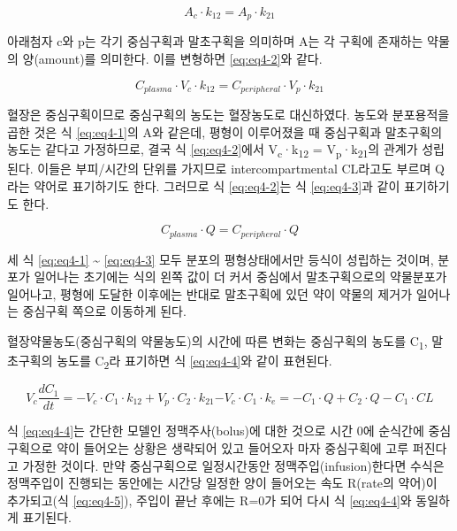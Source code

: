 \documentclass[
  11pt,
  krantz2, a4paper, twoside]{krantz}
\theoremstyle{definition}
\theoremstyle{definition}
\theoremstyle{definition}
\theoremstyle{definition}
\theoremstyle{remark}
\begin{document}
\begin{equation}
A_{c} \cdot k_{12} = A_{p} \cdot k_{21}
\label{eq:eq4-1}
\end{equation}

아래첨자 c와 p는 각기 중심구획과 말초구획을 의미하며 A는 각 구획에 존재하는 약물의 양(amount)를 의미한다. 이를 변형하면 \eqref{eq:eq4-2}와 같다.

\begin{equation}
C_{{plasma}} \cdot V_{c} \cdot k_{12} = C_{{peripheral}} \cdot V_{p} \cdot k_{21}
\label{eq:eq4-2}
\end{equation}

혈장은 중심구획이므로 중심구획의 농도는 혈장농도로 대신하였다. 농도와
분포용적을 곱한 것은 식 \eqref{eq:eq4-1}의 A와 같은데, 평형이 이루어졌을 때
중심구획과 말초구획의 농도는 같다고 가정하므로, 결국 식 \eqref{eq:eq4-2}에서
V\textsubscript{c}·k\textsubscript{12} = V\textsubscript{p}·k\textsubscript{21}의 관계가 성립된다. 이들은 부피/시간의 단위를
가지므로 intercompartmental CL라고도 부르며 Q라는 약어로
표기하기도 한다. 그러므로 식 \eqref{eq:eq4-2}는 식 \eqref{eq:eq4-3}과 같이 표기하기도 한다.

\begin{equation}
C_{{plasma}} \cdot Q = C_{{peripheral}} \cdot Q
\label{eq:eq4-3}
\end{equation}

세 식 \eqref{eq:eq4-1} \textasciitilde{} \eqref{eq:eq4-3} 모두 분포의 평형상태에서만 등식이 성립하는 것이며, 분포가 일어나는 초기에는 식의 왼쪽 값이 더 커서 중심에서 말초구획으로의 약물분포가 일어나고, 평형에 도달한 이후에는 반대로 말초구획에 있던 약이 약물의 제거가 일어나는 중심구획 쪽으로 이동하게 된다.

혈장약물농도(중심구획의 약물농도)의 시간에 따른 변화는 중심구획의 농도를 C\textsubscript{1}, 말초구획의 농도를 C\textsubscript{2}라 표기하면 식 \eqref{eq:eq4-4}와 같이 표현된다.

\begin{equation}
V_{c}\frac{{dC}_{1}}{{dt}} = {- V}_{c} \cdot C_{1} \cdot k_{12} + V_{p} \cdot C_{2} \cdot k_{21}{- V}_{c} \cdot C_{1} \cdot k_{e} 
= - C_{1} \cdot Q + C_{2} \cdot Q - C_{1} \cdot {CL}
\label{eq:eq4-4}
\end{equation}

식 \eqref{eq:eq4-4}는 간단한 모델인 정맥주사(bolus)에 대한 것으로 시간 0에 순식간에 중심구획으로 약이 들어오는 상황은 생략되어 있고 들어오자 마자 중심구획에 고루 퍼진다고 가정한 것이다.
만약 중심구획으로 일정시간동안 정맥주입(infusion)한다면 수식은 정맥주입이 진행되는 동안에는 시간당 일정한 양이 들어오는 속도 R(rate의 약어)이 추가되고(식 \eqref{eq:eq4-5}), 주입이 끝난 후에는 R=0가 되어 다시 식 \eqref{eq:eq4-4}와 동일하게 표기된다.
\end{document}
